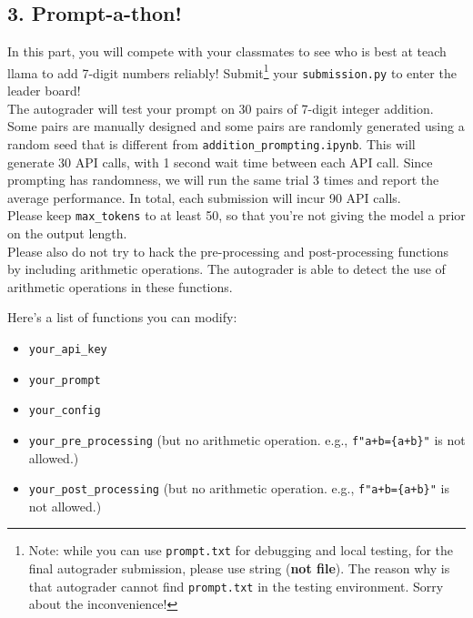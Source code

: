 \documentclass{article}
\theoremstyle{case}
\theoremstyle{definition}
\begin{document}
\newpage
\subsection*{3. Prompt-a-thon!}

In this part, you will compete with your classmates to see who is best at teach llama to add 7-digit numbers reliably! Submit\footnote{Note: while you can use \texttt{prompt.txt} for debugging and local testing, for the final autograder submission, please use string (\textbf{not file}). The reason why is that autograder cannot find \texttt{prompt.txt} in the testing environment. Sorry about the inconvenience!} your \texttt{submission.py} to enter the leader board!\\

The autograder will test your prompt on 30 pairs of 7-digit integer addition. Some pairs are manually designed and some pairs are randomly generated using a random seed that is different from \texttt{addition\_prompting.ipynb}. This will generate 30 API calls, with 1 second wait time between each API call. Since prompting has randomness, we will run the same trial 3 times and report the average performance. In total, each submission will incur 90 API calls. \\

Please keep \texttt{max\_tokens} to at least 50, so that you're not giving the model a prior on the output length. \\ Please also do not try to hack the pre-processing and post-processing functions by including arithmetic operations. The autograder is able to detect the use of arithmetic operations in these functions.

Here's a list of functions you can modify:
\begin{itemize}
    \item \texttt{your\_api\_key}
    \item \texttt{your\_prompt}
    \item \texttt{your\_config}
    \item \texttt{your\_pre\_processing} (but no arithmetic operation. e.g., \texttt{f"a+b=\{a+b\}"} is not allowed.)
    \item \texttt{your\_post\_processing} (but no arithmetic operation. e.g., \texttt{f"a+b=\{a+b\}"} is not allowed.)
\end{itemize}
\end{document}
